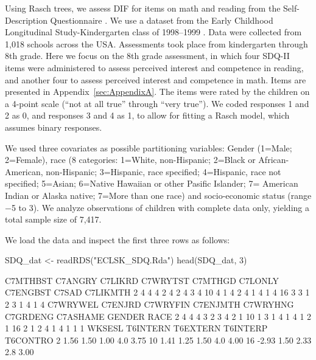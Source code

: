 \documentclass[doc,floatsintext,natbib]{apa7}
\begin{document}
Using Rasch trees, we assess DIF for items on math and reading  from the Self-Description Questionnaire \cite{Boyl94}. We use a dataset from the Early Childhood Longitudinal Study-Kindergarten class of 1998--1999 \citep[ECLS-K; ][]{NCES10}. Data were collected from 1,018 schools across the USA. Assessments took place from kindergarten through 8th grade. Here we focus on the 8th grade assessment, in which four SDQ-II items were administered to assess perceived interest and competence in reading, and another four to assess perceived interest and competence in math. Items are presented in Appendix~\ref{sec:AppendixA}. The items were rated by the children on a 4-point scale (“not at all true” through “very true”). We coded responses 1 and 2 as 0, and responses 3 and 4 as 1, to allow for fitting a Rasch model, which assumes binary responses. 


We used three covariates as possible partitioning variables: Gender (1=Male; 2=Female), race (8 categories: 1=White, non-Hispanic; 2=Black or African-American, non-Hispanic; 3=Hispanic, race specified; 4=Hispanic, race not specified; 5=Asian; 6=Native Hawaiian or other Pasific Islander; 7= American Indian or Alaska native; 7=More than one race) and socio-economic status (range $-$5 to 3).  We analyze observations of children with complete data only, yielding a total sample size of 7,417.


We load the data and inspect the first three rows as follows:

\begin{Schunk}
\begin{Sinput}
 SDQ_dat <- readRDS("ECLSK_SDQ.Rda")
 head(SDQ_dat, 3)
\end{Sinput}
\begin{Soutput}
   C7MTHBST C7ANGRY C7LIKRD C7WRYTST C7MTHGD C7LONLY C7ENGBST C7SAD C7LIKMTH
2         4       4       4        2       4       2        4     3        4
10        4       1       4        2       4       1        4     1        4
16        3       3       1        2       3       1        4     1        4
   C7WRYWEL C7ENJRD C7WRYFIN C7ENJMTH C7WRYHNG C7GRDENG C7ASHAME GENDER RACE
2         4       4        4        3        2        3        4      2    1
10        1       3        1        4        1        4        1      2    1
16        2       1        2        4        1        4        1      1    1
   WKSESL T6INTERN T6EXTERN T6INTERP T6CONTRO
2    1.56     1.50     1.00      4.0     3.75
10   1.41     1.25     1.50      4.0     4.00
16  -2.93     1.50     2.33      2.8     3.00
\end{Soutput}
\end{Schunk}
\end{document}
